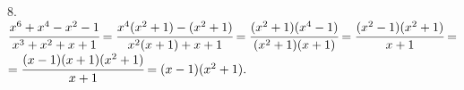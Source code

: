 8. $\cfrac{x^6+x^4-x^2-1}{x^3+x^2+x+1}=\cfrac{x^4(x^2+1)-(x^2+1)}{x^2(x+1)+x+1}=\cfrac{(x^2+1)(x^4-1)}{(x^2+1)(x+1)}=\cfrac{(x^2-1)(x^2+1)}{x+1}=$\\$=
\cfrac{(x-1)(x+1)(x^2+1)}{x+1}=(x-1)(x^2+1).$\\
